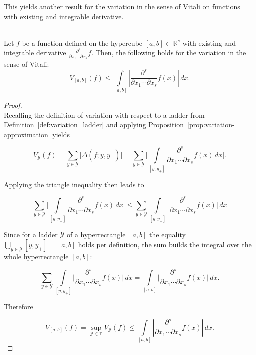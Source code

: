 This yields another result for the variation in the sense of Vitali on functions
with existing and integrable derivative.

\begin{cor} \ \\
    Let $f$ be a function defined on the hypercube $[a,b]\subset \mathbb{R}^s$ with existing and
    integrable derivative $\frac{\partial^s}{\partial x_1 \cdots \partial x_s}
    f$. Then, the following holds for the variation in the sense of Vitali:
    \begin{equation*}
        V_{[a,b]}(f) \leq \int\limits_{[a,b]} \left| \frac{\partial^s}{\partial x_1 \cdots \partial x_s} f(x) \right| \, dx.
    \end{equation*}
    \label{cor:variation-approximation}
\end{cor}

\begin{proof} \ \\
Recalling the definition of variation with respect to a ladder from
Definition~\ref{def:variation_ladder} and applying
Proposition~\ref{prop:variation-approximation} yields

\begin{equation*}
    V_{\mathcal{Y}}(f) =  \sum_{y \in \mathcal{Y}} \big| \Delta(f; y, y_+) \big| = \sum_{y \in \mathcal{Y}} \bigg| \int\limits_{[y,y_+]}\frac{\partial^s}{\partial x_1 \cdots \partial x_s} f(x) \, dx \bigg|.
\end{equation*}

Applying the triangle inequality then leads to

\begin{equation*}
    \sum_{y \in \mathcal{Y}} \bigg| \int\limits_{[y,y_+]}\frac{\partial^s}{\partial x_1 \cdots \partial x_s} f(x) \, dx \bigg| \leq \sum_{y \in \mathcal{Y}} \int\limits_{[y,y_+]}\bigg|\frac{\partial^s}{\partial x_1 \cdots \partial x_s} f(x)\bigg| \, dx
\end{equation*}

Since for a ladder $\mathcal{Y}$ of a hyperrectangle $[a,b]$ the equality
$\bigcup\limits_{y\in\mathcal{Y}}[y,y_+] = [a,b]$ holds per definition, the sum
builds the integral over the whole hyperrectangle $[a,b]$:

\begin{equation*}
    \sum_{y \in \mathcal{Y}} \int\limits_{[y,y_+]}\bigg|\frac{\partial^s}{\partial x_1 \cdots \partial x_s} f(x)\bigg| \, dx = \int\limits_{[a,b]}\bigg|\frac{\partial^s}{\partial x_1 \cdots \partial x_s} f(x)\bigg| \, dx.
\end{equation*}

Therefore

\begin{equation*}
    V_{[a,b]}(f) = \sup_{\mathcal{Y}\in\mathbb{Y}} V_{\mathcal{Y}}(f) \leq \int\limits_{[a,b]} \left| \frac{\partial^s}{\partial x_1 \cdots \partial x_s} f(x) \right| \, dx.
\end{equation*}
\end{proof}

